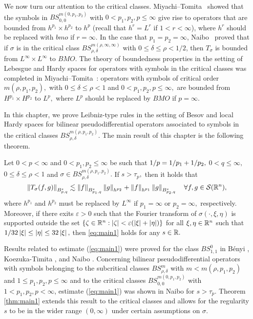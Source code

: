 We now turn our attention to the critical classes. Miyachi--Tomita~\cite{MR3179688} showed that the symbols in $BS^{m(0,p_1,p_2)}_{0,0}$ with $0<p_1,p_2,p\le  \infty $ give rise to operators that are bounded from  $h^{p_1}\times h^{p_2}$ to $h^p$ (recall that $h^{r}=L^r$ if $1<r<\infty$), where $h^{r}$ should be replaced with $bmo$ if $r=\infty.$   In the case that $p_1 = p_2 = \infty$, Naibo~\cite{MR3411149}  proved  that if $\sigma$ is in the critical class $BS^{m(\rho, \infty,\infty)}_{\rho,\delta}$ with $0\le \delta\le \rho<1/2$, then $T_\sigma$ is bounded from $L^{\infty}\times L^{\infty}$ to $BMO.$ The theory of boundedness properties in the setting of Lebesgue and  Hardy  spaces for operators with symbols in the critical classes was completed in Miyachi--Tomita~\cite{MT1, MT2}: operators with symbols of critical order $ m(\rho, p_1,p_2),$ with $0\le \delta\le \rho<1$  and $0< p_1,p_2,p\le \infty,$ are bounded from $H^{p_1}\times H^{p_2}$ to $L^p,$ where  $L^p$ should be replaced by $BMO$ if $p=\infty.$

In this chapter, we prove Leibniz-type rules in the setting of Besov and local Hardy spaces for bilinear pseudodifferential operators associated to symbols in the critical classes $BS^{m(\rho,p_1,p_2)}_{\rho,\delta}$. The main result of this chapter is the following theorem.

\begin{theorem} \label{thm:main1}
Let $0<p<\infty$ and  $0<p_1,p_2\le \infty$ be such that $\hcline,$ $0<q\le \infty,$   $0\le\delta\le \rho<1$ and   $\sigma\in BS^{m(\rho,p_1,p_2)}_{\rho,\delta}.$ If $s>\tau_p,$ then it holds that
\begin{equation}\label{eq:main1}
\norm{T_\sigma(f,g)}{\ibes{p}{s}{q}}\lesssim \norm{f}{\ibes{p_1}{s}{q}}\norm{g}{h^{p_2}} +\norm{f}{h^{p_1}}\norm{g}{\ibes{p_2}{s}{q}}\quad \forall f,g\in \sw,
\end{equation}
where $h^{p_1}$ and $h^{p_2}$ must be replaced by $L^\infty$ if $p_1=\infty$ or $p_2=\infty,$ respectively. Moreover,  if there exits $\varepsilon>0$ such that the Fourier transform of  $\sigma(\cdot,\xi,\eta)$ is  supported outside the set  $\{\zeta\in\rn:\abs{\zeta}<\varepsilon (\abs{\xi}+\abs{\eta})\}$ for all  $\xi,\eta\in\rn$ such that $1/32\abs{\xi}\le \abs{\eta}\le 32 \abs{\xi},$ then \eqref{eq:main1} holds for any $s\in\re.$
\end{theorem}

Results related to estimate (\ref{eq:main1}) were proved for the class $BS^0_{1,1}$ in B\'enyi \cite{MR1996120}, Koezuka-Timita \cite{MR3750316}, and Naibo \citep{MR3393696}. Concerning bilinear pseudodifferential operators with symbols belonging to the subcritical classes $BS^m_{\rho,\delta}$ with $m<m(\rho,p_1,p_2)$ and $1\leq p_1,p_2,p \leq \infty$ and to the critical classes $BS^{m(0,p_1,p_2)}_{0,0}$ with $1<p_1,p_2,p<\infty$, estimate (\ref{eq:main1}) was shown in Naibo \citep[Theorem 1.3]{MR3393696} for $s>\tau_p$. Theorem \ref{thm:main1} extends this result to the critical classes and allows for the regularity $s$ to be in the wider range $(0,\infty)$ under certain assumptions on $\sigma$. 

